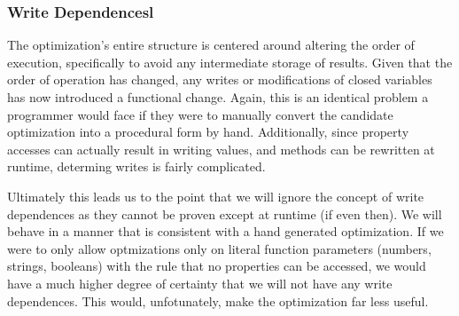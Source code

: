 \subsubsection{Write Dependencesl}

The optimization's entire structure is centered around altering the order of execution, specifically to avoid any intermediate storage of results.  Given that the order of operation has changed, any writes or modifications of closed variables has now introduced a functional change.  Again, this is an identical problem a programmer would face if they were to manually convert the candidate optimization into a procedural form by hand.  Additionally, since property accesses can actually result in writing values, and methods can be rewritten at runtime, determing writes is fairly complicated. 

Ultimately this leads us to the point that we will ignore the concept of write dependences as they cannot be proven except at runtime (if even then).  We will behave in a manner that is consistent with a hand generated optimization.  If we were to only allow optmizations only on literal function parameters (numbers, strings, booleans) with the rule that no properties can be accessed, we would have a much higher degree of certainty that we will not have any write dependences. This would, unfotunately, make the optimization far less useful.  